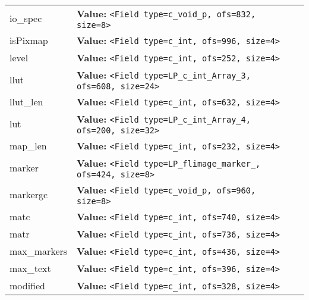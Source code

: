 \begin{longtable}{|p{\varnamewidth}|p{\vardescrwidth}|l}
\cline{1-2}
\raggedright i\-o\-\_\-s\-p\-e\-c\- & \raggedright \textbf{Value:} 
{\tt {\textless}Field type=c\_void\_p, ofs=832, size=8{\textgreater}}&\\
\cline{1-2}
\raggedright i\-s\-P\-i\-x\-m\-a\-p\- & \raggedright \textbf{Value:} 
{\tt {\textless}Field type=c\_int, ofs=996, size=4{\textgreater}}&\\
\cline{1-2}
\raggedright l\-e\-v\-e\-l\- & \raggedright \textbf{Value:} 
{\tt {\textless}Field type=c\_int, ofs=252, size=4{\textgreater}}&\\
\cline{1-2}
\raggedright l\-l\-u\-t\- & \raggedright \textbf{Value:} 
{\tt {\textless}Field type=LP\_c\_int\_Array\_3, ofs=608, size=24{\textgreater}}&\\
\cline{1-2}
\raggedright l\-l\-u\-t\-\_\-l\-e\-n\- & \raggedright \textbf{Value:} 
{\tt {\textless}Field type=c\_int, ofs=632, size=4{\textgreater}}&\\
\cline{1-2}
\raggedright l\-u\-t\- & \raggedright \textbf{Value:} 
{\tt {\textless}Field type=LP\_c\_int\_Array\_4, ofs=200, size=32{\textgreater}}&\\
\cline{1-2}
\raggedright m\-a\-p\-\_\-l\-e\-n\- & \raggedright \textbf{Value:} 
{\tt {\textless}Field type=c\_int, ofs=232, size=4{\textgreater}}&\\
\cline{1-2}
\raggedright m\-a\-r\-k\-e\-r\- & \raggedright \textbf{Value:} 
{\tt {\textless}Field type=LP\_flimage\_marker\_, ofs=424, size=8{\textgreater}}&\\
\cline{1-2}
\raggedright m\-a\-r\-k\-e\-r\-g\-c\- & \raggedright \textbf{Value:} 
{\tt {\textless}Field type=c\_void\_p, ofs=960, size=8{\textgreater}}&\\
\cline{1-2}
\raggedright m\-a\-t\-c\- & \raggedright \textbf{Value:} 
{\tt {\textless}Field type=c\_int, ofs=740, size=4{\textgreater}}&\\
\cline{1-2}
\raggedright m\-a\-t\-r\- & \raggedright \textbf{Value:} 
{\tt {\textless}Field type=c\_int, ofs=736, size=4{\textgreater}}&\\
\cline{1-2}
\raggedright m\-a\-x\-\_\-m\-a\-r\-k\-e\-r\-s\- & \raggedright \textbf{Value:} 
{\tt {\textless}Field type=c\_int, ofs=436, size=4{\textgreater}}&\\
\cline{1-2}
\raggedright m\-a\-x\-\_\-t\-e\-x\-t\- & \raggedright \textbf{Value:} 
{\tt {\textless}Field type=c\_int, ofs=396, size=4{\textgreater}}&\\
\cline{1-2}
\raggedright m\-o\-d\-i\-f\-i\-e\-d\- & \raggedright \textbf{Value:} 
{\tt {\textless}Field type=c\_int, ofs=328, size=4{\textgreater}}&\\

\end{longtable}
